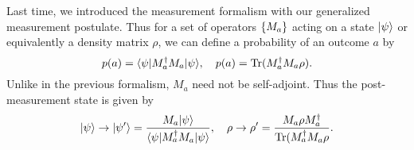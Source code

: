 Last time, we introduced the measurement formalism with our generalized measurement postulate. Thus for a set of operators $\{M_a\}$ acting on a state $\lvert\psi\rangle$ or equivalently a density matrix $\rho$, we can define a probability of an outcome $a$ by
\begin{equation}
    p(a)=\langle\psi\rvert M_a^\dagger M_a \lvert\psi\rangle,\quad p(a)=\operatorname{Tr}(M_a^\dagger M_a \rho).
\end{equation}
Unlike in the previous formalism, $M_a$ need not be self-adjoint. Thus the post-measurement state is given by
\begin{equation}
    \lvert\psi\rangle\to \lvert\psi'\rangle=\frac{M_a\lvert\psi\rangle}{\langle\psi\rvert M_a^\dagger M_a \lvert\psi\rangle}, \quad \rho\to\rho'=\frac{M_a \rho M_a^\dagger}{\operatorname{Tr}(M_a^\dagger M_a \rho}.
\end{equation}

